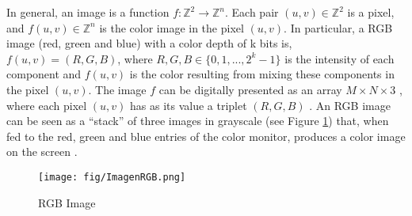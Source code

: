 In general, an image is a function $f:\mathbb{Z}^2 \rightarrow \mathbb{Z}^n$. Each pair $(u,v) \in \mathbb{Z}^2$ is a pixel, and $f(u,v) \in \mathbb Z^n $ is the color image in the pixel $(u,v)$. In particular, a RGB image (red, green and blue) with a color depth of k bits is, $f(u,v) = (R,G,B)$, where $R,G,B \in \{0,1,...,2^k-1\}$ is the intensity of each component and $f(u,v)$ is the color resulting from mixing these components in the pixel $(u,v)$. %
The image $f$ can be digitally presented as an array $M \times N \times 3$ , where each pixel $(u,v)$ has as its value a triplet $(R,G,B)$ \cite{gonzales2004digital}. An RGB image can be seen as a ``stack'' of three images in grayscale (see Figure \ref{fig:ImagenRGB}) that, when fed to the red, green and blue entries of the color monitor, produces a color image on the screen \cite{gonzales2004digital}.


\begin{figure}[htbp]
	\centering
		\texttt{[image: fig/ImagenRGB.png]}
	\caption{RGB Image}
	\label{fig:ImagenRGB}
\end{figure}



	
	
	
	
